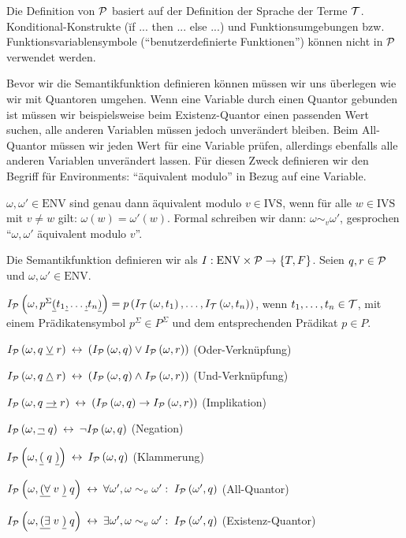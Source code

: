 Die Definition von $\mathcal{P}$ basiert auf der Definition der Sprache der Terme $\mathcal{T}$.
Konditional-Konstrukte (\u{if ... then ... else ...}) und Funktionsumgebungen
bzw. Funktionsvariablensymbole (``benutzerdefinierte Funktionen'') können nicht in $\mathcal{P}$ verwendet werden.

Bevor wir die Semantikfunktion definieren können müssen wir uns überlegen wie
wir mit Quantoren umgehen. Wenn eine Variable durch einen Quantor gebunden ist
müssen wir beispielsweise beim Existenz-Quantor einen passenden Wert suchen,
alle anderen Variablen müssen jedoch unverändert bleiben. Beim All-Quantor
müssen wir jeden Wert für eine Variable prüfen, allerdings ebenfalls alle anderen Variablen
unverändert lassen. Für diesen Zweck definieren wir den Begriff für Environments:
``äquivalent modulo'' in Bezug auf eine Variable.
\begin{defn}
$\omega,\omega' \in \text{ENV}$ sind genau dann äquivalent modulo $v \in \text{IVS}$,
wenn für alle $w \in \text{IVS}$ mit $v \neq w$ gilt: $\omega(w)=\omega'(w)$.
Formal schreiben wir dann: $\omega \sim_{v} \omega'$, gesprochen ``$\omega,\omega'$ äquivalent modulo $v$''.
\end{defn}

\begin{defn}
Die Semantikfunktion definieren wir als $I: \text{ENV}\times\mathcal{P}\to\left\{T,F\right\}$.
Seien $q,r \in \mathcal{P}$ und $\omega,\omega' \in \text{ENV}$.
\begin{\whichenum}
\item
$I_{\mathcal{P}}\left(\omega,p^{\Sigma}\text{\underline{(}}t_1\text{\underline{,}}\ldots\text{\underline{,}}t_n\text{\underline{)}}\right) = p\left(I_{\mathcal{T}}\left(\omega,t_1\right),\ldots,I_{\mathcal{T}}\left(\omega,t_n\right)\right)$, wenn $t_1,\ldots,t_n \in \mathcal{T}$,
mit einem Prädikatensymbol $p^{\Sigma} \in P^{\Sigma}$ und dem entsprechenden Prädikat $p \in P$.
\item $I_{\mathcal{P}}\left(\omega,q\;\underline{\vee}\;r\right) \:\leftrightarrow\: \left(I_{\mathcal{P}}\left(\omega,q\right) \vee I_{\mathcal{P}}\left(\omega,r\right)\right)$ (Oder-Verknüpfung)
\item $I_{\mathcal{P}}\left(\omega,q\;\underline{\wedge}\;r\right) \:\leftrightarrow\: \left(I_{\mathcal{P}}\left(\omega,q\right) \wedge I_{\mathcal{P}}\left(\omega,r\right)\right)$ (Und-Verknüpfung)
\item $I_{\mathcal{P}}\left(\omega,q\;\underline{\to}\;r\right) \:\leftrightarrow\: \left(I_{\mathcal{P}}\left(\omega,q\right) \to I_{\mathcal{P}}\left(\omega,r\right)\right)$ (Implikation)
\item $I_{\mathcal{P}}\left(\omega,\underline{\text{$\neg$}}\;q\right) \:\leftrightarrow\: \text{$\neg$} I_{\mathcal{P}}\left(\omega,q\right)$ (Negation)
\item $I_{\mathcal{P}}\left(\omega,\underline{(}\;q\;\underline{)}\right) \:\leftrightarrow\: I_{\mathcal{P}}\left(\omega,q\right)$ (Klammerung)
\item $I_{\mathcal{P}}\left(\omega,\underline{(\text{$\forall$}}\;v\;\underline{)}\;q\right) \:\leftrightarrow\: \text{$\forall$} \omega', \omega \sim_v \omega': \; I_{\mathcal{P}}\left(\omega',q\right)$ (All-Quantor)
\item $I_{\mathcal{P}}\left(\omega,\underline{(\text{$\exists$}}\;v\;\underline{)}\;q\right) \:\leftrightarrow\: \text{$\exists$} \omega', \omega \sim_v \omega': \; I_{\mathcal{P}}\left(\omega',q\right)$ (Existenz-Quantor)
\end{\whichenum}
\end{defn}

